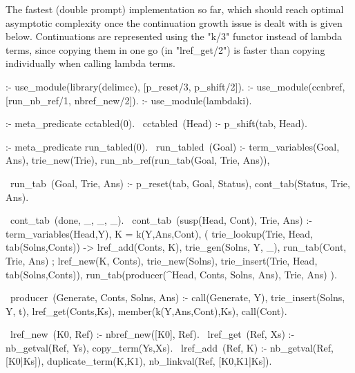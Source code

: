 The fastest (double prompt) implementation so far, which should reach optimal asymptotic complexity
once the continuation growth issue is dealt with is given below. Continuations are represented using
the "k/3" functor instead of lambda terms, since copying them in one go (in "lref_get/2") is faster
than copying individually when calling lambda terms. 
\begin{prolog-framed}[name=cctable8,numbers=left]
  :- use_module(library(delimcc), [p_reset/3, p_shift/2]).
  :- use_module(ccnbref, [run_nb_ref/1, nbref_new/2]).
  :- use_module(lambdaki).
        
  :- meta_predicate cctabled(0). 
  ~cctabled~(Head) :- p_shift(tab, Head).
        
  :- meta_predicate run_tabled(0). 
  ~run_tabled~(Goal) :-
     term_variables(Goal, Ans), trie_new(Trie),
     run_nb_ref(run_tab(Goal, Trie, Ans)),

  ~run_tab~(Goal, Trie, Ans) :-                                                                                               
     p_reset(tab, Goal, Status),                                                                                                 
     cont_tab(Status, Trie, Ans).                                                                                           

  ~cont_tab~(done, _, _, _).
  ~cont_tab~(susp(Head, Cont), Trie, Ans) :-                                                                                  
     term_variables(Head,Y), K = k(Y,Ans,Cont),                                                                                  
     (  trie_lookup(Trie, Head, tab(Solns,Conts))
     -> lref_add(Conts, K),
        trie_gen(Solns, Y, _),
        run_tab(Cont, Trie, Ans)
     ;  lref_new(K, Conts),
        trie_new(Solns),
        trie_insert(Trie, Head, tab(Solns,Conts)),                                                                               
        run_tab(producer(\Y^Head, Conts, Solns, Ans), Trie, Ans)                                                            
     ).
     
  ~producer~(Generate, Conts, Solns, Ans) :-                                                                                       
     call(Generate, Y),                                                                                                          
     trie_insert(Solns, Y, t),
     lref_get(Conts,Ks), member(k(Y,Ans,Cont),Ks),                                                                               
     call(Cont). 

  ~lref_new~(K0, Ref) :- nbref_new([K0], Ref).                                                                           
  ~lref_get~(Ref, Xs) :- nb_getval(Ref, Ys), copy_term(Ys,Xs).                                                                     
  ~lref_add~(Ref, K) :- 
    nb_getval(Ref, [K0|Ks]), duplicate_term(K,K1), 
    nb_linkval(Ref, [K0,K1|Ks]).
\end{prolog-framed}

